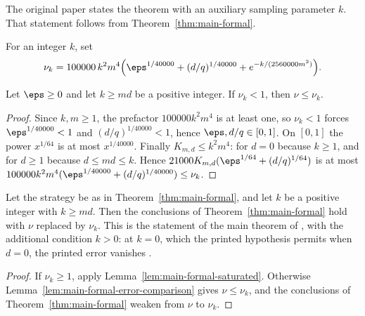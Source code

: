 The original paper states the theorem with an auxiliary sampling parameter
$k$.  That statement follows from Theorem~\ref{thm:main-formal}.

\begin{definition}\label{def:main-formal-sampling-error}
	\leanok
	For an integer $k$, set
	\[
		\nu_k=100000\,k^2m^4\Bigl(\eps^{1/40000}+(d/q)^{1/40000}
		+e^{-k/(2560000m^2)}\Bigr).
	\]
\end{definition}

\begin{lemma}\label{lem:main-formal-error-comparison}
	\leanok
	Let $\eps\ge0$ and let $k\ge md$ be a positive integer.  If $\nu_k<1$, then
	$\nu\le\nu_k$.
\end{lemma}
\begin{proof}
	\leanok
	Since $k,m\ge1$, the prefactor $100000k^2m^4$ is at least one, so
	$\nu_k<1$ forces $\eps^{1/40000}<1$ and $(d/q)^{1/40000}<1$, hence
	$\eps,d/q\in[0,1]$.  On $[0,1]$ the power $x^{1/64}$ is at most
	$x^{1/40000}$.  Finally $K_{m,d}\le k^2m^4$: for $d=0$ because $k\ge1$, and
	for $d\ge1$ because $d\le md\le k$.  Hence
	$21000K_{m,d}(\eps^{1/64}+(d/q)^{1/64})$ is at most
	$100000k^2m^4(\eps^{1/40000}+(d/q)^{1/40000})\le\nu_k$.
\end{proof}

\begin{corollary}\label{cor:main-formal-sampling}
	\leanok
	Let the strategy be as in Theorem~\ref{thm:main-formal}, and let $k$ be a
	positive integer with $k\ge md$.  Then the conclusions of
	Theorem~\ref{thm:main-formal} hold with $\nu$ replaced by $\nu_k$.  This
	is the statement of the main theorem of
	\cite{Ji2020LowIndividualDegree}, with the additional condition $k>0$: at
	$k=0$, which the printed hypothesis permits when $d=0$, the printed error
	vanishes \cite{gap:issue-422-main-formal-zero-k-boundary}.
\end{corollary}
\begin{proof}
	\leanok
	If $\nu_k\ge1$, apply Lemma~\ref{lem:main-formal-saturated}.  Otherwise
	Lemma~\ref{lem:main-formal-error-comparison} gives $\nu\le\nu_k$, and the
	conclusions of Theorem~\ref{thm:main-formal} weaken from $\nu$ to $\nu_k$.
\end{proof}
